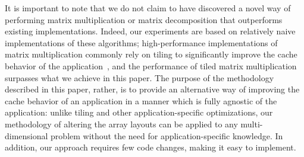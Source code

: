 It is important to note that we do not claim to have discovered a novel way of performing matrix multiplication or matrix decomposition that outperforms existing implementations. Indeed, our experiments are based on relatively naive implementations of these algorithms; high-performance implementations of matrix multiplication commonly rely on tiling to significantly improve the cache behavior of the application~\cite{1214317}, and the performance of tiled matrix multiplication surpasses what we achieve in this paper. The purpose of the methodology described in this paper, rather, is to provide an alternative way of improving the cache behavior of an application in a manner which is fully agnostic of the application: unlike tiling and other application-specific optimizations, our methodology of altering the array layouts can be applied to any multi-dimensional problem without the need for application-specific knowledge. In addition, our approach requires few code changes, making it easy to implement.